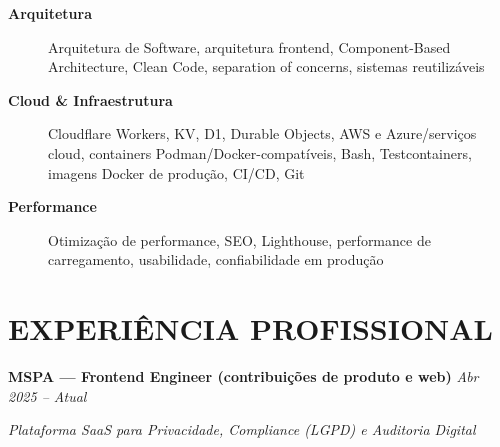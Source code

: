 \documentclass[10pt,a4paper]{article}
\begin{document}
\begin{description}
    \item[\textbf{Arquitetura}]
    Arquitetura de Software, arquitetura frontend,
    Component-Based Architecture, Clean Code,
    separation of concerns, sistemas reutilizáveis

    \item[\textbf{Cloud \& Infraestrutura}]
    Cloudflare Workers, KV, D1, Durable Objects,
    AWS e Azure/serviços cloud, containers Podman/Docker-compatíveis,
    Bash, Testcontainers, imagens Docker de produção, CI/CD, Git

    \item[\textbf{Performance}]
    Otimização de performance, SEO, Lighthouse,
    performance de carregamento, usabilidade,
    confiabilidade em produção

\end{description}


\section*{EXPERIÊNCIA PROFISSIONAL}

\noindent
\textbf{MSPA — Frontend Engineer (contribuições de produto e web)}
\hfill
\textit{Abr 2025 -- Atual}

\textit{Plataforma SaaS para Privacidade, Compliance (LGPD) e Auditoria Digital}
\end{document}
